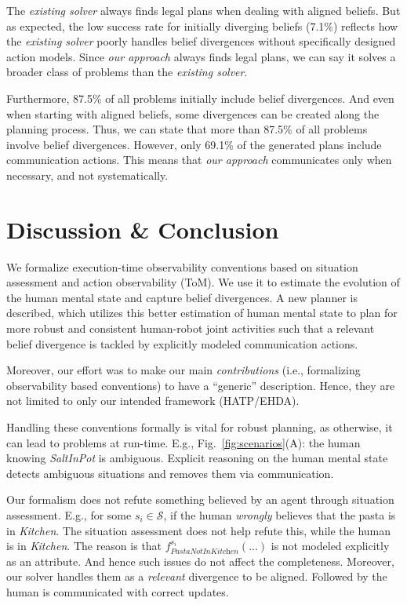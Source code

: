 \documentclass[letterpaper]{article} %
\begin{document}
The \textit{existing solver} always finds legal plans when dealing with aligned beliefs. But as expected, the low success rate for initially diverging beliefs (7.1\%) reflects how the \textit{existing solver} poorly handles belief divergences without specifically designed action models. Since \textit{our approach} always finds legal plans, we can say it solves a broader class of problems than the \textit{existing solver}.

Furthermore, 87.5\% of all problems initially include belief divergences. And even when starting with aligned beliefs, some divergences can be created along the planning process. Thus, we can state that more than 87.5\% of all problems involve belief divergences. However, only 69.1\% of the generated plans include communication actions. This means that \textit{our approach} communicates only when necessary, and not systematically.   

\section{Discussion \& Conclusion}
We formalize execution-time observability conventions based on situation assessment and action observability (ToM). We use it to estimate the evolution of the human mental state and capture belief divergences. 
A new planner is described, which utilizes this better estimation of human mental state to plan for more robust and consistent human-robot joint activities such that a relevant belief divergence is tackled by explicitly modeled communication actions.  

Moreover, our effort was to make our main \textit{contributions} (i.e., formalizing observability based conventions) to have a ``generic'' description. Hence, they are not limited to only our intended framework (HATP/EHDA).

Handling these conventions formally is vital for robust planning, as otherwise, it can lead to problems at run-time. 
E.g., Fig.~\ref{fig:scenarios}(A): the human knowing \textit{SaltInPot} is ambiguous. 
Explicit reasoning on the human mental state detects ambiguous situations and removes them via communication. 

Our formalism does not refute something believed by an agent through situation assessment. 
E.g., for some $s_i \in \mathcal{S}$, if the human \textit{wrongly} believes that the pasta is in \textit{Kitchen}. The situation assessment does not help refute this, while the human is in \textit{Kitchen}. 
The reason is that $f_{\textit{PastaNotInKitchen}}^{s_i}(...)$ is not modeled explicitly as an attribute. 
And hence such issues do not affect the completeness. 
Moreover, our solver handles them as a \textit{relevant} divergence to be aligned. Followed by the human is communicated with correct updates.


\end{document}
